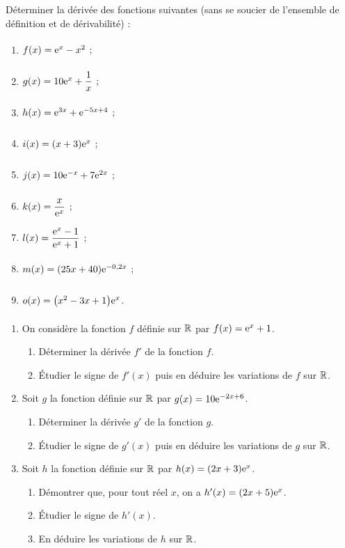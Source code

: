 \documentclass[a4paper,11pt]{article}
\begin{document}
\pagebreak


\medskip

Déterminer la dérivée des fonctions suivantes (sans se soucier de l'ensemble de définition et de dérivabilité) :
%
\begin{multicols}{3}
	\newcommand\espv{\dfrac{\e^x-1}{\e^x+1}}
	\begin{enumerate}
		\item $f(x)=\e^x-x^2\vphantom{\espv}$ ;
		\item $g(x)=10\e^x+\dfrac1x\vphantom{\espv}$ ;
		\item $h(x)=\e^{3x}+\e^{-5x+4}\vphantom{\espv}$ ;
		\item $i(x)=(x+3)\e^x\vphantom{\espv}$ ;
		\item $j(x)=10\e^{-x}+7\e^{2x}\vphantom{\espv}$ ;
		\item $k(x)=\dfrac{x}{\e^x}\vphantom{\espv}$ ;
		\item $l(x)=\dfrac{{\rm e}^x-1}{{\rm e}^x+1}$ ;
		\item $m(x)=(25x+40)\e^{-0,2x}\vphantom{\espv}$ ;
		\item $o(x)=\big(x^2-3x+1\big)\e^x\vphantom{\espv}$.
	\end{enumerate}
\end{multicols}

\medskip


\smallskip

\begin{enumerate}
	\item On considère la fonction $f$ définie sur $\R$ par $f(x)={\rm e}^x+1$.
	\begin{enumerate}
		\item Déterminer la dérivée $f'$ de la fonction $f$.
		\item \'{E}tudier le signe de $f'(x)$ puis en déduire les variations de $f$ sur $\R$.
	\end{enumerate}
	\item Soit $g$ la fonction définie sur $\R$ par $g(x)=10{\rm e}^{-2x+6}$.
	\begin{enumerate}
		\item Déterminer la dérivée $g'$ de la fonction $g$.
		\item \'{E}tudier le signe de $g'(x)$ puis en déduire les variations de $g$ sur $\R$.
	\end{enumerate}
	\item Soit $h$ la fonction définie sur $\R$ par $h(x)=(2x+3){\rm e}^x$.
	\begin{enumerate}
		\item Démontrer que, pour tout réel $x$, on a $h'(x)=(2x+5){\rm e}^x$.
		\item \'{E}tudier le signe de $h'(x)$.
		\item En déduire les variations de $h$ sur $\R$.
	\end{enumerate}
\end{enumerate}
\end{document}
